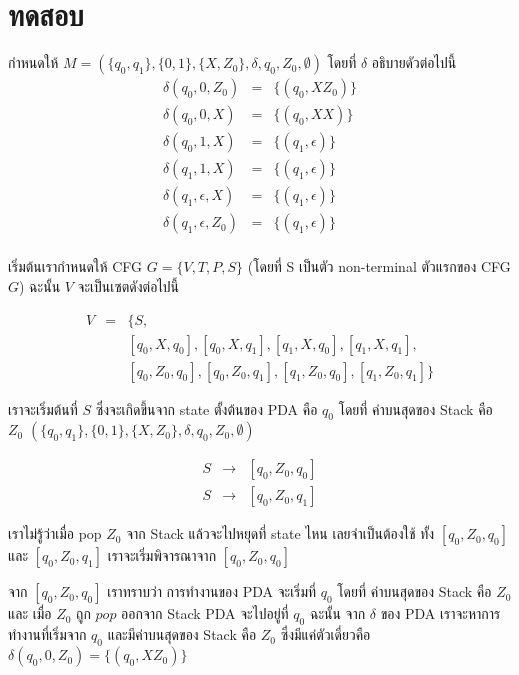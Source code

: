 \chapter{ทดสอบ}
\par{
กำหนดให้ $M = (\{q_0, q_1\}, \{0, 1\}, \{X, Z_0\}, \delta, q_0, Z_0, \emptyset)$ โดยที่ $\delta$ อธิบายดัวต่อไปนี้
\begin{eqnarray*}
\delta(q_0, 0, Z_0) & = & \{(q_0, XZ_0)\} \\
\delta(q_0, 0, X) & = & \{(q_0, XX)\} \\
\delta(q_0, 1, X) & = & \{(q_1, \epsilon)\} \\
\delta(q_1, 1, X) & = & \{(q_1, \epsilon)\} \\
\delta(q_1, \epsilon, X) & = & \{(q_1, \epsilon)\} \\
\delta(q_1, \epsilon, Z_0) & = & \{(q_1, \epsilon)\} \\
\end{eqnarray*}
}

\par{
เริ่มต้นเรากำหนดให้ CFG $G = \{V, T, P, S\}$ (โดยที่ S เป็นตัว non-terminal ตัวแรกของ CFG $G$) ฉะนั้น $V$ จะเป็นเซตดังต่อไปนี้

\begin{eqnarray*}
V & = & \{S , \\
&  & [q_0, X, q_0], [q_0, X, q_1], [q_1, X, q_0], [q_1, X, q_1], \\ 
&  & [q_0, Z_0, q_0], [q_0, Z_0, q_1], [q_1, Z_0, q_0], [q_1, Z_0, q_1] \}
\end{eqnarray*}

เราจะเริ่มต้นที่ $S$ ซึ่งจะเกิดขึ้นจาก state ตั้งต้นของ PDA คือ $q_0$ โดยที่ ค่าบนสุดของ Stack คือ $Z_0$ $(\{q_0, q_1\}, \{0, 1\}, \{X, Z_0\}, \delta, q_0, Z_0, \emptyset)$

\begin{eqnarray*}
S & \rightarrow & [q_0,Z_0, q_0] \\
S & \rightarrow & [q_0,Z_0, q_1] 
\end{eqnarray*}
}

\par{
เราไม่รู้ว่าเมื่อ pop $Z_0$ จาก Stack แล้วจะไปหยุดที่ state ไหน เลยจำเป็นต้องใช้ ทั้ง $[q_0, Z_0, q_0]$ และ $[q_0, Z_0, q_1]$ เราจะเริ่มพิจารณาจาก $[q_0,Z_0, q_0]$
}

\par{
จาก $[q_0,Z_0, q_0]$ เราทราบว่า การทำงานของ PDA จะเริ่มที่ $q_0$ โดยที่ ค่าบนสุดของ Stack คือ $Z_0$ และ เมื่อ $Z_0$ ถูก $pop$ ออกจาก Stack PDA จะไปอยู่ที่ $q_0$ ฉะนั้น จาก $\delta$ ของ PDA เราจะหาการทำงานที่เริ่มจาก $q_0$ และมีค่าบนสุดของ Stack คือ $Z_0$ ซึ่งมีแค่ตัวเดี่ยวคือ $\delta(q_0, 0, Z_0) = \{(q_0, XZ_0)\}$
}

